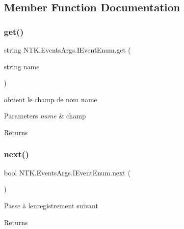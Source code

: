\subsection{Member Function Documentation}
\mbox{\label{interface_n_t_k_1_1_events_args_1_1_i_event_enum_a5d7e5d33ce2e0dc3762750b7f1e80414}} 
\subsubsection{\texorpdfstring{get()}{get()}}
{\footnotesize\ttfamily string N\+T\+K.\+Events\+Args.\+I\+Event\+Enum.\+get (\begin{DoxyParamCaption}\item[{string}]{name }\end{DoxyParamCaption})}



obtient le champ de nom {\ttfamily name} 


\begin{DoxyParams}{Parameters}
{\em name} & champ\\
\hline
\end{DoxyParams}
\begin{DoxyReturn}{Returns}

\end{DoxyReturn}
\mbox{\label{interface_n_t_k_1_1_events_args_1_1_i_event_enum_a2b8c40d6d7e9899659aa5a469da93586}} 
\subsubsection{\texorpdfstring{next()}{next()}}
{\footnotesize\ttfamily bool N\+T\+K.\+Events\+Args.\+I\+Event\+Enum.\+next (\begin{DoxyParamCaption}{ }\end{DoxyParamCaption})}



Passe à l\textquotesingle{}enregistrement suivant 

\begin{DoxyReturn}{Returns}

\end{DoxyReturn}


